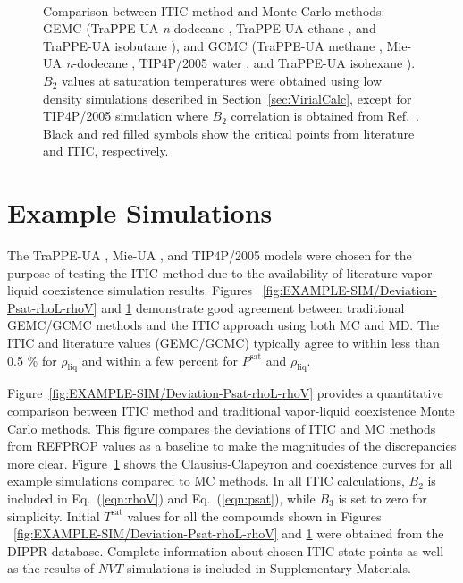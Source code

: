 \documentclass[5p,times]{elsarticle}
\begin{document}
\begin{figure}[]
\centering
{}\label{aa}
\label{bb}\\
\label{cc}
\label{dd}
\caption{
Comparison between ITIC method and Monte Carlo methods: GEMC (TraPPE-UA \textit{n}-dodecane \cite{Martin1998}, TraPPE-UA ethane \cite{Martin1998}, and TraPPE-UA isobutane \cite{Wick2000}), and GCMC (TraPPE-UA methane \cite{Shen2008}, Mie-UA \textit{n}-dodecane \cite{Potoff2009}, TIP4P/2005 water \cite{Shen2008}, and TraPPE-UA isohexane \cite{Mick2017}). $B_2$ values at saturation temperatures were obtained using low density simulations described in Section~\ref{sec:VirialCalc}, except for TIP4P/2005 simulation where $B_2$ correlation is obtained from Ref.~\cite{Benjamin2007,Chialvo2006}. Black and red filled symbols show the critical points from literature and ITIC, respectively.
}
\label{fig:EXAMPLE-SIM/all}
\end{figure}

\section{Example Simulations} \label{sec:ExampleSim}
The TraPPE-UA \cite{Martin1998,Martin1999,Wick2000}, Mie-UA \cite{Potoff2009,Mick2017,Barhaghi2017,Mick2015}, and TIP4P/2005 \cite{Abascal2005} models were chosen for the purpose of testing the ITIC method due to the availability of literature vapor-liquid coexistence simulation results. Figures ~\ref{fig:EXAMPLE-SIM/Deviation-Psat-rhoL-rhoV} and \ref{fig:EXAMPLE-SIM/all} demonstrate good agreement between traditional GEMC/GCMC methods and the ITIC approach using both MC and MD. The ITIC and literature values (GEMC/GCMC) typically agree to within less than 0.5 \% for $\rho_\mathrm{liq}$ and within a few percent for $P^\mathrm{sat}$ and $\rho_\mathrm{liq}$.

Figure~\ref{fig:EXAMPLE-SIM/Deviation-Psat-rhoL-rhoV} provides a quantitative comparison between ITIC method and traditional vapor-liquid coexistence Monte Carlo methods. This figure compares the deviations of ITIC and MC methods from REFPROP values as a baseline to make the magnitudes of the discrepancies more clear. Figure~\ref{fig:EXAMPLE-SIM/all} shows the Clausius-Clapeyron and coexistence curves for all example simulations compared to MC methods. In all ITIC calculations, $B_2$ is included in Eq.~(\ref{eqn:rhoV}) and Eq.~(\ref{eqn:psat}), while $B_3$ is set to zero for simplicity. Initial $T^\mathrm{sat}$ values for all the compounds shown in Figures ~\ref{fig:EXAMPLE-SIM/Deviation-Psat-rhoL-rhoV} and \ref{fig:EXAMPLE-SIM/all} were obtained from the DIPPR \cite{DIPPR2004} database. Complete information about chosen ITIC state points as well as the results of $NVT$ simulations is included in Supplementary Materials.
\end{document}
